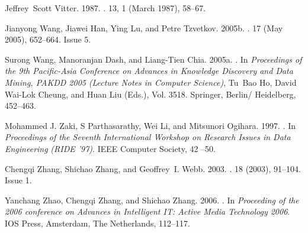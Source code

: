 \begin{thebibliography}{00}
{Jeffrey~Scott Vitter}. 1987.
\newblock {}.
 {13}, 1 (March 1987), 58--67.
\newblock


{Jianyong Wang}, {Jiawei Han}, {Ying Lu}, {and} {Petre Tzvetkov}. 2005b.
\newblock {}.
  {17} (May 2005),
  652--664.
\newblock
Issue 5.


{Surong Wang}, {Manoranjan Dash}, {and} {Liang-Tien Chia}. 2005a.
\newblock {}. In
  {\em Proceedings of the 9th Pacific-Asia Conference on Advances in Knowledge
  Discovery and Data Mining, PAKDD 2005} {\em (Lecture Notes in Computer
  Science)}, {Tu~Bao Ho}, {David Wai-Lok Cheung}, {and} {Huan Liu} (Eds.), Vol.
  3518. Springer, Berlin/ Heidelberg, 452--463.


{Mohammed J. Zaki}, {S Parthasarathy}, {Wei Li}, {and} {Mitsunori Ogihara}. 1997.
\newblock {}. In {\em Proceedings of the Seventh International Workshop
  on Research Issues in Data Engineering} {\em (RIDE '97)}. IEEE Computer
  Society, 42 --50.
\newblock
{}


{Chengqi Zhang}, {Shichao Zhang}, {and} {Geoffrey~I. Webb}. 2003.
\newblock {}.
  {18} (2003), 91--104.
\newblock
Issue 1.


{Yanchang Zhao}, {Chengqi Zhang}, {and} {Shichao Zhang}. 2006.
\newblock {}. In
  {\em Proceeding of the 2006 conference on Advances in Intelligent IT: Active
  Media Technology 2006}. IOS Press, Amsterdam, The Netherlands, 112--117.

\end{thebibliography}
\fi

